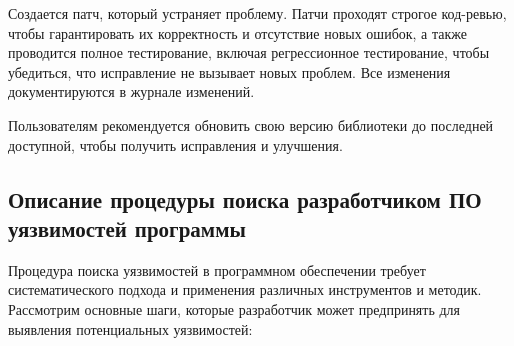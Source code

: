 Создается патч, который устраняет проблему. Патчи проходят строгое код-ревью, чтобы гарантировать их корректность и отсутствие новых ошибок, а также проводится полное тестирование, включая регрессионное тестирование, чтобы убедиться, что исправление не вызывает новых проблем. Все изменения документируются в журнале изменений.

Пользователям рекомендуется обновить свою версию библиотеки до последней доступной, чтобы получить исправления и улучшения.

\subsection{Описание процедуры поиска разработчиком ПО уязвимостей программы}

Процедура поиска уязвимостей в программном обеспечении требует систематического подхода и применения различных инструментов и методик. Рассмотрим основные шаги, которые разработчик может предпринять для выявления потенциальных уязвимостей:


